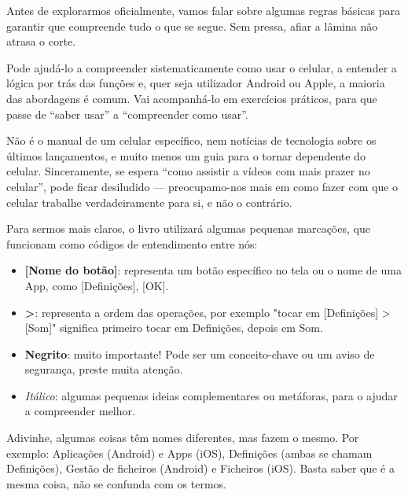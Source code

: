 
Antes de explorarmos oficialmente, vamos falar sobre algumas regras básicas para garantir que compreende tudo o que se segue. Sem pressa, afiar a lâmina não atrasa o corte.


Pode ajudá-lo a compreender sistematicamente como usar o celular, a entender a lógica por trás das funções e, quer seja utilizador Android ou Apple, a maioria das abordagens é comum. Vai acompanhá-lo em exercícios práticos, para que passe de “saber usar” a “compreender como usar”.

Não é o manual de um celular específico, nem notícias de tecnologia sobre os últimos lançamentos, e muito menos um guia para o tornar dependente do celular. Sinceramente, se espera “como assistir a vídeos com mais prazer no celular”, pode ficar desiludido — preocupamo-nos mais em como fazer com que o celular trabalhe verdadeiramente para si, e não o contrário.


Para sermos mais claros, o livro utilizará algumas pequenas marcações, que funcionam como códigos de entendimento entre nós:

\begin{itemize}
  \item \textbf{[Nome do botão]}: representa um botão específico no tela ou o nome de uma App, como [Definições], [OK].
  \item \textbf{>}: representa a ordem das operações, por exemplo "tocar em [Definições] > [Som]" significa primeiro tocar em Definições, depois em Som.
  \item \textbf{Negrito}: muito importante! Pode ser um conceito-chave ou um aviso de segurança, preste muita atenção.
  \item \emph{Itálico}: algumas pequenas ideias complementares ou metáforas, para o ajudar a compreender melhor.
\end{itemize}


Adivinhe, algumas coisas têm nomes diferentes, mas fazem o mesmo. Por exemplo: Aplicações (Android) e Apps (iOS), Definições (ambas se chamam Definições), Gestão de ficheiros (Android) e Ficheiros (iOS). Basta saber que é a mesma coisa, não se confunda com os termos.

